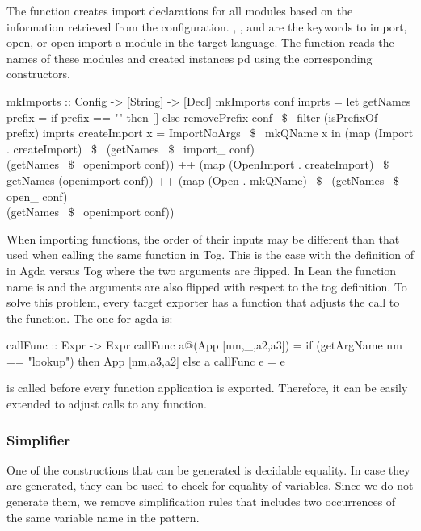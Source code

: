 The function  creates import declarations for all modules based on the information retrieved from the configuration. , , and  are the keywords to import, open, or open-import a module in the target language. The function reads the names of these modules and created instances pd  using the corresponding constructors. 
\begin{hscode}
mkImports :: Config -> [String] -> [Decl]
mkImports conf imprts =
  let getNames prefix =
        if prefix == "" then [] 
        else removePrefix conf ~$\$$~ filter (isPrefixOf prefix) imprts
       createImport x = ImportNoArgs ~$\$$~ mkQName x
  in (map (Import . createImport) ~$\$$~ 
         (getNames ~$\$$~ import_ conf) \\ (getNames ~$\$$~ openimport conf))
  ++ (map (OpenImport . createImport) ~$\$$~ getNames (openimport conf))
  ++ (map (Open . mkQName) ~$\$$~
         (getNames ~$\$$~ open_ conf) \\ (getNames ~$\$$~ openimport conf))
\end{hscode} 

When importing functions, the order of their inputs may be different than that used when calling the same function in Tog. This is the case with the definition of  in Agda versus Tog where the two arguments are flipped. In Lean the function name is  and the arguments are also flipped with respect to the tog definition. To solve this problem, every target exporter has a function  that adjusts the call to the function. The one for agda is: 
\begin{hscode}
callFunc :: Expr -> Expr
callFunc a@(App [nm,_,a2,a3]) =
  if (getArgName nm == "lookup") then App [nm,a3,a2] else a
callFunc e = e
\end{hscode}
\noindent {} is called before every function application is exported. Therefore, it can be easily extended to adjust calls to any function. 

\subsubsection{Simplifier}
One of the constructions that can be generated is decidable equality. In case they are generated, they can be used to check for equality of variables. Since we do not generate them, we remove simplification rules that includes two occurrences of the same variable name in the pattern. 

